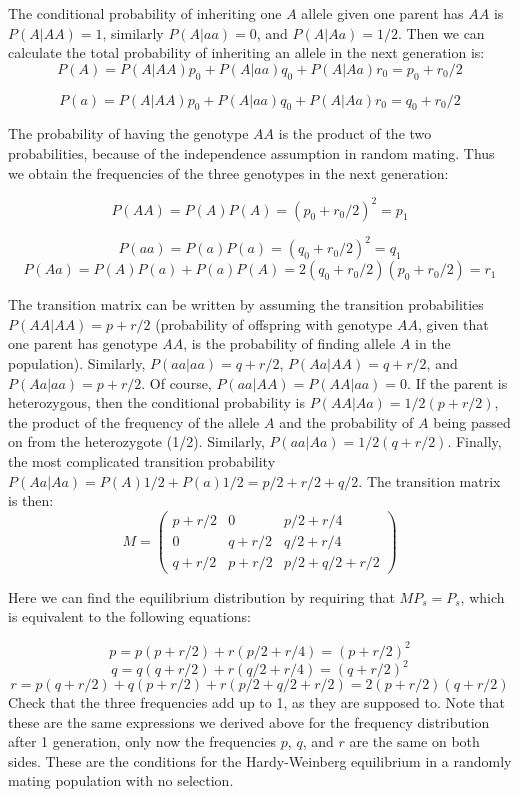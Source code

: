 \documentclass[
  letterpaper,
  DIV=11,
  numbers=noendperiod]{scrreprt}
\begin{document}
The conditional probability of inheriting one \(A\) allele given one
parent has \(AA\) is \(P (A | AA) = 1\), similarly \(P(A | aa) = 0\),
and \(P(A | Aa) = 1/2\). Then we can calculate the total probability of
inheriting an allele in the next generation is:
\[ P(A) = P (A | AA)p_0 + P(A | aa) q_0 + P(A | Aa) r_0 = p_0 + r_0/2\]

\[ P(a) = P (A | AA)p_0 + P(A | aa) q_0 + P(A | Aa) r_0 = q_0 + r_0/2\]

The probability of having the genotype \(AA\) is the product of the two
probabilities, because of the independence assumption in random mating.
Thus we obtain the frequencies of the three genotypes in the next
generation:

\[P(AA) = P(A) P(A) = (p_0 + r_0/2)^2 = p_1\]

\[P(aa) = P(a) P(a) = (q_0 + r_0/2)^2 = q_1\]
\[P(Aa) = P(A) P(a) + P(a)P(A) = 2(q_0 + r_0/2)(p_0 + r_0/2) = r_1\]

The transition matrix can be written by assuming the transition
probabilities \(P(AA | AA) = p + r/2\) (probability of offspring with
genotype \(AA\), given that one parent has genotype \(AA\), is the
probability of finding allele \(A\) in the population). Similarly,
\(P(aa | aa) = q + r/2\), \(P(Aa | AA) = q + r/2\), and
\(P(Aa | aa) = p + r/2\). Of course, \(P(aa | AA ) = P(AA | aa) = 0\).
If the parent is heterozygous, then the conditional probability is
\(P(AA | Aa) = 1/2( p + r/2)\), the product of the frequency of the
allele \(A\) and the probability of \(A\) being passed on from the
heterozygote (1/2). Similarly, \(P(aa | Aa ) = 1/2( q + r/2)\). Finally,
the most complicated transition probability
\(P(Aa | Aa) = P(A) 1/2 + P(a) 1/2 = p/2 + r/2 + q/2\). The transition
matrix is then:
\[ M = \left(\begin{array}{ccc}p + r/2 & 0 & p/2 + r/4 \\0 & q + r/2 & q/2 + r/4 \\ q + r/2 &  p + r/2 & p/2 + q/2 + r/2\end{array}\right) \]

Here we can find the equilibrium distribution by requiring that
\(M P_s = P_s\), which is equivalent to the following equations:

\[ p = p (p + r/2) + r (p/2 + r/4) = (p + r/2)^2\]
\[ q = q(q + r/2) + r (q/2 + r/4) = (q + r/2)^2 \]
\[ r = p(q + r/2) + q(p+r/2) + r (p/2 + q/2 + r/2) = 2(p + r/2)(q + r/2) \]
Check that the three frequencies add up to 1, as they are supposed to.
Note that these are the same expressions we derived above for the
frequency distribution after 1 generation, only now the frequencies
\(p\), \(q\), and \(r\) are the same on both sides. These are the
conditions for the Hardy-Weinberg equilibrium in a randomly mating
population with no selection.
\end{document}
